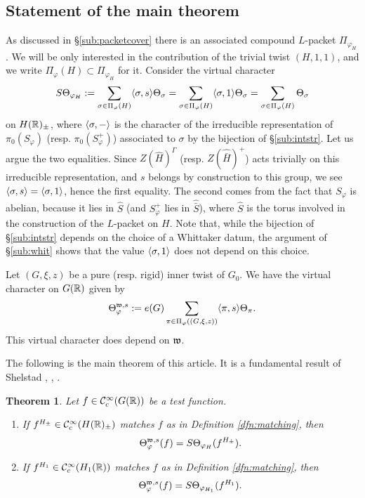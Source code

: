 \documentclass{article}
\newtheorem{thm}{Theorem}[subsection]
\theoremstyle{definition}
\numberwithin{equation}{section}
\renewcommand{\-}{\hyp{}}
\newcommand{\warn}[1]{{\leavevmode\color{red}[#1]}}
\begin{document}



\subsection{Statement of the main theorem}

As discussed in \S\ref{sub:packetcover} there is an associated compound $L$\-packet $\Pi_{\varphi_H}$. We will be only interested in the contribution of the trivial twist $(H,1,1)$, and we write $\Pi_\varphi(H) \subset \Pi_{\varphi_H}$ for it. Consider the virtual character
\[ S\Theta_{\varphi_H} := \sum_{\sigma \in \Pi_\varphi(H)} \langle\sigma,s\rangle\Theta_\sigma = \sum_{\sigma \in \Pi_\varphi(H)} \langle\sigma,1\rangle\Theta_\sigma = \sum_{\sigma \in \Pi_\varphi(H)} \Theta_\sigma\]
on $H(\mathbb{R})_\pm$, where $\langle\sigma,-\rangle$ is the character of the irreducible representation of $\pi_0(S_\varphi)$ (resp. $\pi_0(S_\varphi^+)$) associated to $\sigma$ by the bijection of \S\ref{sub:intstr}. Let us argue the two equalities. Since $Z(\hat H)^\Gamma$ (resp. $Z(\hat{\bar H})^+$) acts trivially on this irreducible representation, and $s$ belongs by construction to this group, we see $\langle\sigma,s\rangle=\langle\sigma,1\rangle$, hence the first equality. The second comes from the fact that $S_\varphi$ is abelian, because it lies in $\hat S$ (and $S_\varphi^+$ lies in $\hat{\bar S}$), where $\hat S$ is the torus involved in the construction of the $L$\-packet on $H$. Note that, while the bijection of \S\ref{sub:intstr} depends on the choice of a Whittaker datum, the argument of \S\ref{sub:whit} shows that the value $\langle\sigma,1\rangle$ does not depend on this choice.

Let $(G,\xi,z)$ be a pure (resp. rigid) inner twist of $G_0$. We have the virtual character on $G(\mathbb{R})$ given by
\[ \Theta_{\varphi}^{\mathfrak{w},s} := e(G)\sum_{\pi \in \Pi_\varphi((G,\xi,z))} \langle\pi,s\rangle\Theta_\pi. \]
This virtual character does depend on $\mathfrak{w}$.

The following is the main theorem of this article. It is a fundamental result of Shelstad \cite{She82}, \cite{SheTE2}, \cite{SheTE3}.
\begin{thm} \label{thm:main1}
Let $f \in \mathcal{C}^\infty_c(G(\mathbb{R}))$ be a test function.
\begin{enumerate}
	\item If $f^{H_\pm} \in \mathcal{C}^\infty_c(H(\mathbb{R})_\pm)$ matches $f$ as in Definition \ref{dfn:matching}, then
	\[ \Theta_\varphi^{\mathfrak{w},s}(f) = S\Theta_{\varphi_H}(f^{H_\pm}). \]
	\item If $f^{H_1} \in \mathcal{C}^\infty_c(H_1(\mathbb{R}))$ matches $f$ as in Definition \ref{dfn:matching}, then
	\[ \Theta_\varphi^{\mathfrak{w},s}(f) = S\Theta_{\varphi_{H_1}}(f^{H_1}). \]
\end{enumerate}
\end{thm}
\end{document}
